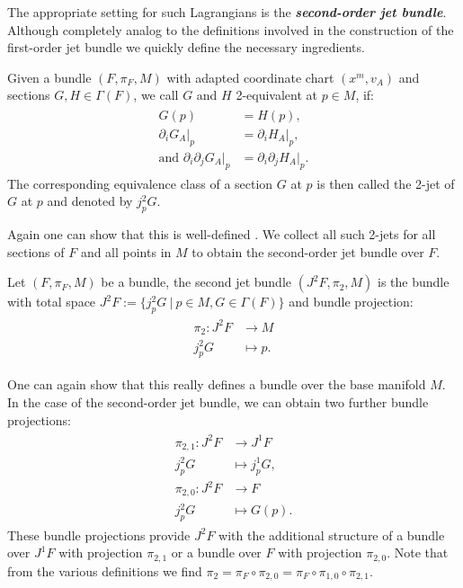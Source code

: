 The appropriate setting for such Lagrangians is the \textbf{\textit{second-order jet bundle}}. Although completely analog to the definitions involved in the construction of the first-order jet bundle we quickly define the necessary ingredients. 
\begin{definition}[2-jet]
Given a bundle $(F, \pi_F, M)$ with adapted coordinate chart $(x^m, v_A)$ and sections $G,H \in \Gamma(F)$, we call $G$ and $H$ 2-equivalent at $p \in M$, if:
\begin{align}
    \begin{aligned}
    G(p) &= H(p), \\
    \partial_i G_A  \big \vert_p &= \partial_i H_A \big \vert_p, \\
    \text{and \ \ }
    \partial_i \partial_j G_A  \big \vert_ p &= \partial_i \partial_j H_A \big \vert_ p .
    \end{aligned}
\end{align}
The corresponding equivalence class of a section $G$ at $p$ is then called the 2-jet of $G$ at $p$ and denoted by $j^2_pG$.
\end{definition}
Again one can show that this is well-defined \cite{saunders_1989}. We collect all such 2-jets for all sections of $F$ and all points in $M$ to obtain the second-order jet bundle over $F$.
\begin{definition}
Let $(F, \pi_F, M)$ be a bundle, the second jet bundle $(J^2F,\pi_2,M)$ is the bundle with total space $J^2F := \{j^2_pG \  \vert \  p \in M, G \in \Gamma(F)\}$ and bundle projection: 
\begin{align}
    \begin{aligned}
\pi_2 : J^2F &\longrightarrow M \\
j^2_pG &\longmapsto p.
    \end{aligned}
\end{align}
\end{definition}
\begin{remark}
One can again show that this really defines a bundle over the base manifold $M$. In the case of the second-order jet bundle, we can obtain two further bundle projections: 
\begin{align}
    \begin{aligned}
    \pi_{2,1} : J^2F &\longrightarrow J^1F \\
    j^2_pG &\longmapsto j^1_pG ,\\[0.5ex]
    \pi_{2,0} : J^2F &\longrightarrow F \\
    j^2_pG &\longmapsto G(p).
    \end{aligned}
\end{align}
These bundle projections provide $J^2F$ with the additional structure of a bundle over $J^1F$ with projection $\pi_{2,1}$ or a bundle over $F$ with projection $\pi_{2,0}$. Note that from the various definitions we find $\pi_{2} = \pi_F \circ \pi_{2,0} = \pi_F \circ \pi_{1,0} \circ \pi_{2,1}$.
\end{remark}
